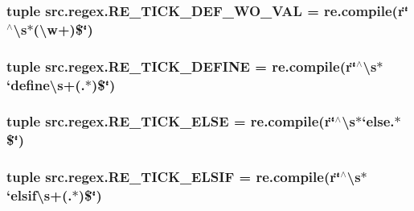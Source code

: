 \hypertarget{namespacesrc_1_1regex_a300290019acc926fd55fd4406ae113de}{
\subsubsection[{R\-E\-\_\-\-T\-I\-C\-K\-\_\-\-D\-E\-F\-\_\-\-W\-O\-\_\-\-V\-A\-L}]{\setlength{\rightskip}{0pt plus 5cm}tuple src.\-regex.\-R\-E\-\_\-\-T\-I\-C\-K\-\_\-\-D\-E\-F\-\_\-\-W\-O\-\_\-\-V\-A\-L = re.\-compile(r\char`\"{}$^\wedge$\textbackslash{}s$\ast$(\textbackslash{}w+)\$\char`\"{})}}\label{namespacesrc_1_1regex_a300290019acc926fd55fd4406ae113de}
\hypertarget{namespacesrc_1_1regex_a082b6e2cd74e499fd9dfc349fd137285}{
\subsubsection[{R\-E\-\_\-\-T\-I\-C\-K\-\_\-\-D\-E\-F\-I\-N\-E}]{\setlength{\rightskip}{0pt plus 5cm}tuple src.\-regex.\-R\-E\-\_\-\-T\-I\-C\-K\-\_\-\-D\-E\-F\-I\-N\-E = re.\-compile(r\char`\"{}$^\wedge$\textbackslash{}s$\ast$`define\textbackslash{}s+(.$\ast$)\$\char`\"{})}}\label{namespacesrc_1_1regex_a082b6e2cd74e499fd9dfc349fd137285}
\hypertarget{namespacesrc_1_1regex_a56d5f3fcc341b5cd282452c6cb155826}{
\subsubsection[{R\-E\-\_\-\-T\-I\-C\-K\-\_\-\-E\-L\-S\-E}]{\setlength{\rightskip}{0pt plus 5cm}tuple src.\-regex.\-R\-E\-\_\-\-T\-I\-C\-K\-\_\-\-E\-L\-S\-E = re.\-compile(r\char`\"{}$^\wedge$\textbackslash{}s$\ast$`else.$\ast$\$\char`\"{})}}\label{namespacesrc_1_1regex_a56d5f3fcc341b5cd282452c6cb155826}
\hypertarget{namespacesrc_1_1regex_ac813c5c2fd6c17cdfe5686ab1eeb3640}{
\subsubsection[{R\-E\-\_\-\-T\-I\-C\-K\-\_\-\-E\-L\-S\-I\-F}]{\setlength{\rightskip}{0pt plus 5cm}tuple src.\-regex.\-R\-E\-\_\-\-T\-I\-C\-K\-\_\-\-E\-L\-S\-I\-F = re.\-compile(r\char`\"{}$^\wedge$\textbackslash{}s$\ast$`elsif\textbackslash{}s+(.$\ast$)\$\char`\"{})}}\label{namespacesrc_1_1regex_ac813c5c2fd6c17cdfe5686ab1eeb3640}
